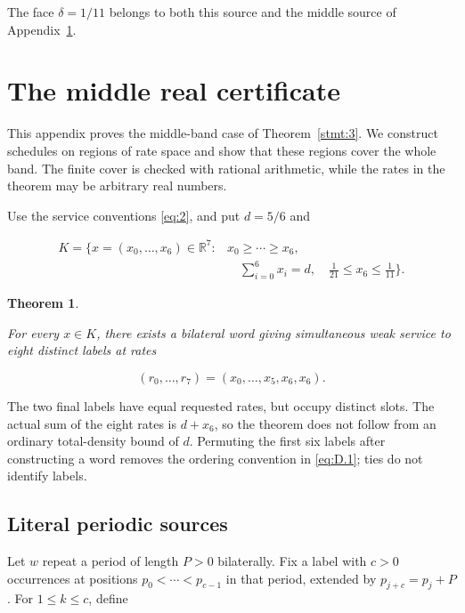 \documentclass[11pt,a4paper]{article}
\newtheorem{theorem}{Theorem}
\begin{document}
The face \(\delta=1/11\) belongs to both this source and the middle source of Appendix~\ref{sec:D}.

\section{The middle real certificate}\label{sec:D}

This appendix proves the middle-band case of Theorem~\ref{stmt:3}. We construct schedules on regions of rate space and show that these regions cover the whole band. The finite cover is checked with rational arithmetic, while the rates in the theorem may be arbitrary real numbers.

Use the service conventions \eqref{eq:2}, and put \(d=5/6\) and

\begin{equation}
\begin{aligned}
K=\{x=(x_0,\ldots,x_6)\in\mathbb R^7:
 &x_0\ge\cdots\ge x_6,\\
 &\quad \sum_{i=0}^6x_i=d,\quad
 \frac1{21}\le x_6\le\frac1{11}\}.
\end{aligned}
\tag{D.1}\label{eq:D.1}
\end{equation}

\begin{theorem}\label{stmt:D.1}

 For every \(x\in K\), there exists a bilateral word giving simultaneous weak service to eight distinct labels at rates

\begin{equation}
(r_0,\ldots,r_7)=(x_0,\ldots,x_5,x_6,x_6).
\tag{D.2}\label{eq:D.2}
\end{equation}

\end{theorem}

The two final labels have equal requested rates, but occupy distinct slots. The actual sum of the eight rates is \(d+x_6\), so the theorem does not follow from an ordinary total-density bound of \(d\). Permuting the first six labels after constructing a word removes the ordering convention in \eqref{eq:D.1}; ties do not identify labels.

\subsection{Literal periodic sources}\label{sec:D.1}

Let \(w\) repeat a period of length \(P>0\) bilaterally. Fix a label with \(c>0\) occurrences at positions \(p_0<\cdots<p_{c-1}\) in that period, extended by \(p_{j+c}=p_j+P\). For \(1\le k\le c\), define
\end{document}
